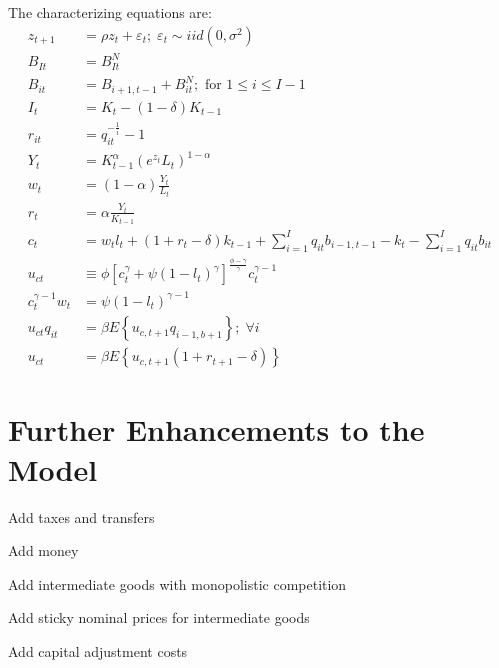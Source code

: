 \documentclass[letterpaper,11pt]{article}
\theoremstyle{definition}
\numberwithin{equation}{section}
\newcommand\ve{\varepsilon}
\begin{document}
\begin{spacing}{1.5}
		The characterizing equations are:
		\begin{align}
			z_{t+1} & = \rho z_t + \ve_t; \; \ve_t \sim iid(0, \sigma^2) \\
			B_{It} & = B^N_{It} \\
			B_{it} & = B_{i+1,t-1} + B^N_{it}; \text{ for } 1 \le i \le I-1 \\
			I_t & = K_t - (1-\delta)K_{t-1} \\
			r_{it} & = q_{it}^{-\frac{1}{i}} - 1 \\
			Y_t & = K_{t-1}^\alpha (e^{z_t} L_t)^{1-\alpha} \\
			w_t & = (1-\alpha) \frac{Y_t}{L_t} \\
			r_t & = \alpha \frac{Y_t}{K_{t-1}} \\
			c_t & = w_t l_t + (1 + r_t - \delta) k_{t-1} + \sum_{i=1}^I q_{it} b_{i-1,t-1} - k_t - \sum_{i=1}^I  q_{it} b_{it} \\
			u_{ct} & \equiv \phi [ c_t^\gamma + \psi(1-l_t)^\gamma]^{\frac{\phi-\gamma}{\gamma}} c_t^{\gamma-1} \\
			c_t^{\gamma-1} w_t & = \psi (1-l_t)^{\gamma-1} \\
			u_{ct} q_{it} & = \beta E\left\{ u_{c,t+1} q_{i-1,b+1} \right\} ; \; \forall i \\
			u_{ct} & = \beta E\left\{ u_{c,t+1} (1+r_{t+1} - \delta) \right\}
		\end{align}

\clearpage
\section{Further Enhancements to the Model} \label{sec_Model2}
	
	Add taxes and transfers

	Add money

	Add intermediate goods with monopolistic competition

	Add sticky nominal prices for intermediate goods

	Add capital adjustment costs

\end{spacing}
\end{document}
